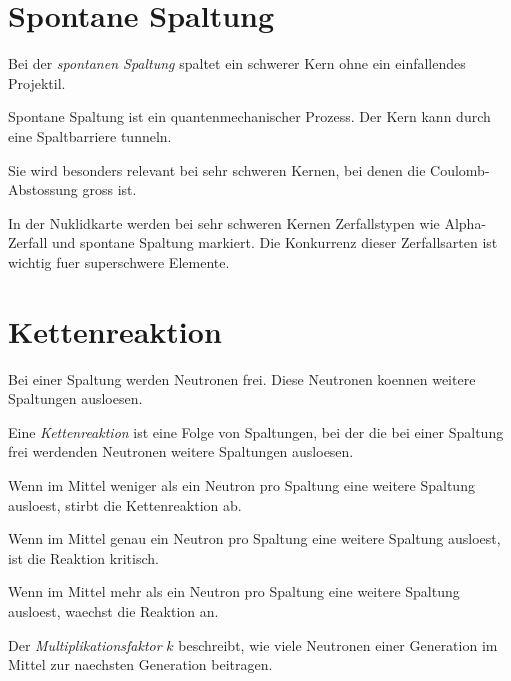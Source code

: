 \section{Spontane Spaltung}

\begin{definitionbox}
Bei der \emph{spontanen Spaltung} spaltet ein schwerer Kern ohne ein einfallendes
Projektil.
\end{definitionbox}

\begin{conceptbox}
Spontane Spaltung ist ein quantenmechanischer Prozess.
Der Kern kann durch eine Spaltbarriere tunneln.

Sie wird besonders relevant bei sehr schweren Kernen, bei denen die Coulomb-Abstossung
gross ist.
\end{conceptbox}

\begin{notebox}
In der Nuklidkarte werden bei sehr schweren Kernen Zerfallstypen wie Alpha-Zerfall
und spontane Spaltung markiert.
Die Konkurrenz dieser Zerfallsarten ist wichtig fuer superschwere Elemente.
\end{notebox}

\section{Kettenreaktion}

Bei einer Spaltung werden Neutronen frei.
Diese Neutronen koennen weitere Spaltungen ausloesen.

\begin{definitionbox}
Eine \emph{Kettenreaktion} ist eine Folge von Spaltungen, bei der die bei einer
Spaltung frei werdenden Neutronen weitere Spaltungen ausloesen.
\end{definitionbox}

\begin{conceptbox}
Wenn im Mittel weniger als ein Neutron pro Spaltung eine weitere Spaltung ausloest,
stirbt die Kettenreaktion ab.

Wenn im Mittel genau ein Neutron pro Spaltung eine weitere Spaltung ausloest,
ist die Reaktion kritisch.

Wenn im Mittel mehr als ein Neutron pro Spaltung eine weitere Spaltung ausloest,
waechst die Reaktion an.
\end{conceptbox}

\begin{definitionbox}
Der \emph{Multiplikationsfaktor} $k$ beschreibt, wie viele Neutronen einer Generation
im Mittel zur naechsten Generation beitragen.
\end{definitionbox}

